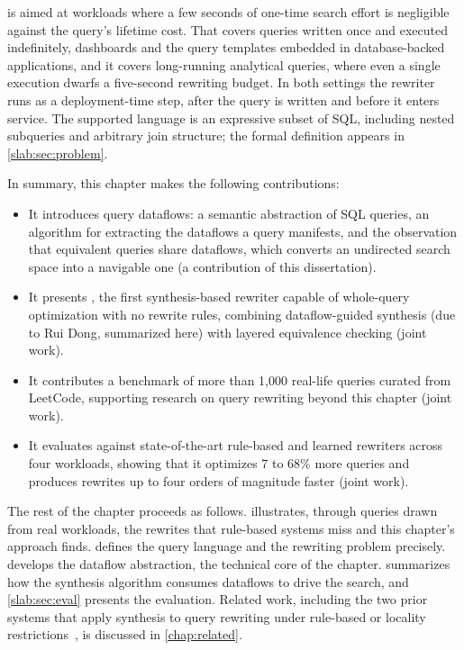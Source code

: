 \slabcity is aimed at workloads where a few seconds of one-time search
effort is negligible against the query's lifetime cost. That covers
queries written once and executed indefinitely, dashboards and the
query templates embedded in database-backed applications, and it
covers long-running analytical queries, where even a single execution
dwarfs a five-second rewriting budget. In both settings the rewriter
runs as a deployment-time step, after the query is written and before
it enters service. The supported language is an expressive subset of
SQL, including nested subqueries and arbitrary join structure; the
formal definition appears in \cref{slab:sec:problem}.

In summary, this chapter makes the following contributions:
\begin{itemize}[leftmargin=*]
\item
It introduces query dataflows: a semantic abstraction of SQL queries,
an algorithm for extracting the dataflows a query manifests, and the
observation that equivalent queries share dataflows, which converts an
undirected search space into a navigable one (a contribution of this
dissertation).
\item
It presents \slabcity, the first synthesis-based rewriter capable of
whole-query optimization with no rewrite rules, combining
dataflow-guided synthesis (due to Rui Dong, summarized here) with
layered equivalence checking (joint work).
\item
It contributes a benchmark of more than 1{,}000 real-life queries
curated from LeetCode, supporting research on query rewriting beyond
this chapter (joint work).
\item
It evaluates \slabcity against state-of-the-art rule-based and learned
rewriters across four workloads, showing that it optimizes 7 to 68\%
more queries and produces rewrites up to four orders of magnitude
faster (joint work).
\end{itemize}

The rest of the chapter proceeds as follows.
 illustrates, through queries drawn
from real workloads, the rewrites that rule-based systems miss and
this chapter's approach finds.  defines the
query language and the rewriting problem precisely.
 develops the dataflow abstraction, the
technical core of the chapter.  summarizes
how the synthesis algorithm consumes dataflows to drive the search,
and \cref{slab:sec:eval} presents the evaluation. Related work,
including the two prior systems that apply synthesis to query
rewriting under rule-based or locality
restrictions~\cite{zhou2021sia,wang2022optimizing}, is discussed in
\cref{chap:related}.
